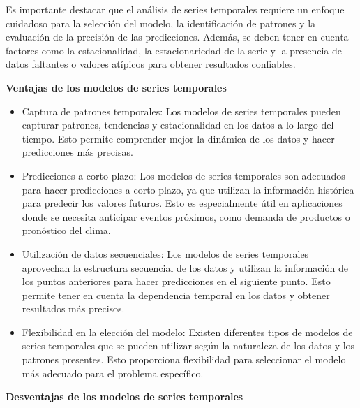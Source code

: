 Es importante destacar que el análisis de series temporales requiere un enfoque cuidadoso para la selección del modelo, la identificación de patrones y la evaluación de la precisión de las predicciones. Además, se deben tener en cuenta factores como la estacionalidad, la estacionariedad de la serie y la presencia de datos faltantes o valores atípicos para obtener resultados confiables.

\textbf{Ventajas de los modelos de series temporales}

\begin{itemize}
    \item Captura de patrones temporales: Los modelos de series temporales pueden capturar patrones, tendencias y estacionalidad en los datos a lo largo del tiempo. Esto permite comprender mejor la dinámica de los datos y hacer predicciones más precisas.
    \item Predicciones a corto plazo: Los modelos de series temporales son adecuados para hacer predicciones a corto plazo, ya que utilizan la información histórica para predecir los valores futuros. Esto es especialmente útil en aplicaciones donde se necesita anticipar eventos próximos, como demanda de productos o pronóstico del clima.
    \item Utilización de datos secuenciales: Los modelos de series temporales aprovechan la estructura secuencial de los datos y utilizan la información de los puntos anteriores para hacer predicciones en el siguiente punto. Esto permite tener en cuenta la dependencia temporal en los datos y obtener resultados más precisos.
    \item Flexibilidad en la elección del modelo: Existen diferentes tipos de modelos de series temporales que se pueden utilizar según la naturaleza de los datos y los patrones presentes. Esto proporciona flexibilidad para seleccionar el modelo más adecuado para el problema específico.
\end{itemize}

\textbf{Desventajas de los modelos de series temporales}

